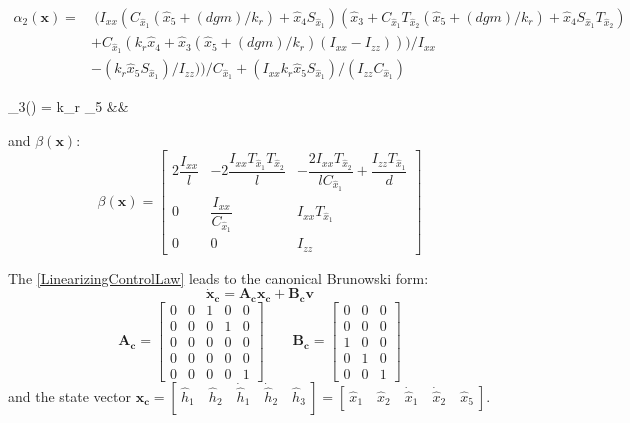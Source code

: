 \documentclass[11pt,a4paper]{scrartcl}
\begin{document}
\begin{equation}
	\begin{split}
	\alpha_2(\mathbf{x}) = & \
	(I_{xx} (C_{\hat{x}_1} ( \hat{x}_5 + (d g m)/k_r) + \hat{x}_4 S_{\hat{x}_1}) (\hat{x}_3 + C_{\hat{x}_1} T_{\hat{x}_2}
	( \hat{x}_5 + (d g m)/k_r) + \hat{x}_4 S_{\hat{x}_1} T_{\hat{x}_2}) \\
	&+ C_{\hat{x}_1} (k_r \hat{x}_4 + \hat{x}_3 (\hat{x}_5 + (d g m)/k_r) (I_{xx} - I_{zz})))/I_{xx} \\
	&- (k_r \hat{x}_5 S_{\hat{x}_1})/I_{zz}))/C_{\hat{x}_1} + (I_{xx} k_r \hat{x}_5 S_{\hat{x}_1})/(I_{zz} C_{\hat{x}_1})
	\end{split}
\end{equation}

\begin{flalign}
\alpha_3() = k_r _5 &&
\end{flalign}
and $ \beta(\mathbf{x}) $:
\begin{equation}
	\beta(\mathbf{x}) = 
	\begin{bmatrix}
	2 \dfrac{I_{xx}}{l} & -2 \dfrac{I_{xx} T_{\hat{x}_1} T_{\hat{x}_2}}{l} & - \dfrac{2 I_{xx} T_{\hat{x}_2}}{l C_{\hat{x}_1}} + \dfrac{I_{zz} T_{\hat{x}_1}}{d} \\
	0 & \dfrac{I_{xx}}{C_{\hat{x}_1}} & I_{xx} T_{\hat{x}_1} \\
	0 & 0 & I_{zz}
	\end{bmatrix}
\end{equation}

The \eqref{LinearizingControlLaw} leads to the canonical Brunowski form:
\begin{equation}
	\mathbf{\dot{x}_c = A_c x_c + B_c v}
\end{equation}
\renewcommand{\arraystretch}{1}
\begin{equation}
	\mathbf{A_c} = 
	\begin{bmatrix}
	0 & 0 & 1 & 0 & 0 \\
	0 & 0 & 0 & 1 & 0 \\
	0 & 0 & 0 & 0 & 0 \\
	0 & 0 & 0 & 0 & 0 \\
	0 & 0 & 0 & 0 & 1	
	\end{bmatrix} \qquad
	\mathbf{B_c} = 
	\begin{bmatrix}
	0 & 0 & 0 \\
	0 & 0 & 0 \\
	1 & 0 & 0 \\
	0 & 1 & 0 \\
	0 & 0 & 1
	\end{bmatrix}
\end{equation}
and the state vector $ \mathbf{x_c} = [ \ \hat{h}_1 \quad \hat{h}_2 \quad \dot{\hat{h}}_1 \quad \dot{\hat{h}}_2 \quad \hat{h}_3 \ ] = [ \ \hat{x}_1 \quad \hat{x}_2 \quad \dot{\hat{x}}_1 \quad \dot{\hat{x}}_2 \quad \hat{x}_5 \ ] $.
\end{document}
